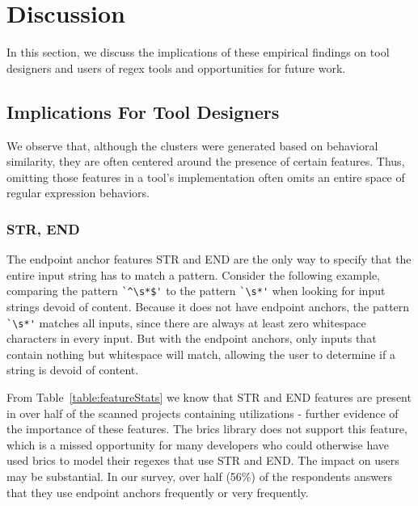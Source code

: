 \section{Discussion}
\label{sec:discussion}

In this section, we discuss the implications of these empirical findings on tool designers and users of regex tools and opportunities for future work.

\leavevmode\color{gray}
\subsection{Implications For Tool Designers}

We observe that, although the clusters were generated based on behavioral similarity, they are often centered around the presence of certain features. Thus, omitting those features in a tool's implementation often omits an entire space of regular expression behaviors.


\subsubsection{STR, END}
The endpoint anchor features STR and END are the only way to specify that the entire input string has to match a pattern.  Consider the following example, comparing the pattern \verb!`^\s*$'! to the pattern \verb!`\s*'! when looking for input strings devoid of content.  Because it does not have endpoint anchors, the pattern \verb!`\s*'! matches all inputs, since there are always at least zero whitespace characters in every input.  But with the endpoint anchors, only inputs that contain nothing but whitespace will match, allowing the user to determine if a string is devoid of content.

From Table~\ref{table:featureStats} we know that STR and END features are present in over half of the scanned projects containing utilizations - further evidence of the importance of these features.  The brics library does not support this feature, which is a missed opportunity for many developers who could otherwise have used brics to model their regexes that use STR and END. The impact on users may be substantial. In our survey, over half (56\%) of the respondents answers that they use endpoint anchors frequently or very frequently.


